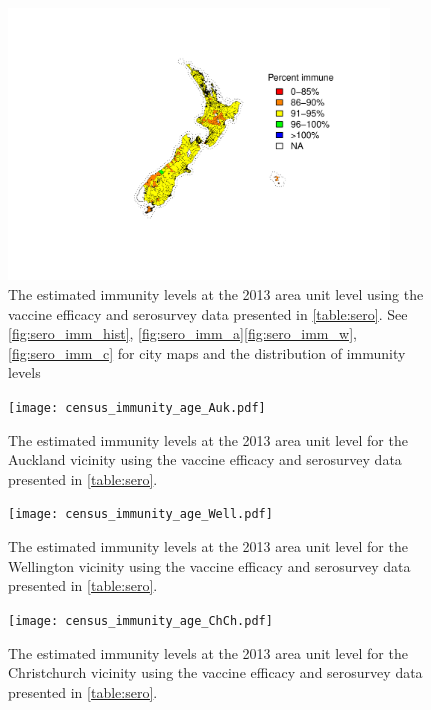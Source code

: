\documentclass{article}
\begin{document}
\begin{figure}
     \begin{center}
     \includegraphics[width=0.9\textwidth]{census_immunity_age.pdf}
     \end{center}
     \caption{The estimated immunity levels at the 2013 area unit level using the vaccine efficacy and serosurvey data presented in \autoref{table:sero}. See \autoref{fig:sero_imm_hist}, \autoref{fig:sero_imm_a}\autoref{fig:sero_imm_w}, \autoref{fig:sero_imm_c} for city maps and the distribution of immunity levels}
     \label{fig:sero_imm_map}
\end{figure}

\begin{figure}[H]
     \begin{center}
     \texttt{[image: census\_immunity\_age\_Auk.pdf]}
     \end{center}
     \caption{The estimated immunity levels at the 2013 area unit level for the Auckland vicinity using the vaccine efficacy and serosurvey data presented in \autoref{table:sero}.}
     \label{fig:sero_imm_a}
\end{figure}

\begin{figure}[H]
     \begin{center}
     \texttt{[image: census\_immunity\_age\_Well.pdf]}
     \end{center}
    \caption{The estimated immunity levels at the 2013 area unit level for the Wellington vicinity using the vaccine efficacy and serosurvey data presented in \autoref{table:sero}.}
     \label{fig:sero_imm_w}
\end{figure}

\begin{figure}[H]
     \begin{center}
     \texttt{[image: census\_immunity\_age\_ChCh.pdf]}
     \end{center}
    \caption{The estimated immunity levels at the 2013 area unit level for the Christchurch vicinity using the vaccine efficacy and serosurvey data presented in \autoref{table:sero}.}
     \label{fig:sero_imm_c}
\end{figure}
\end{document}
